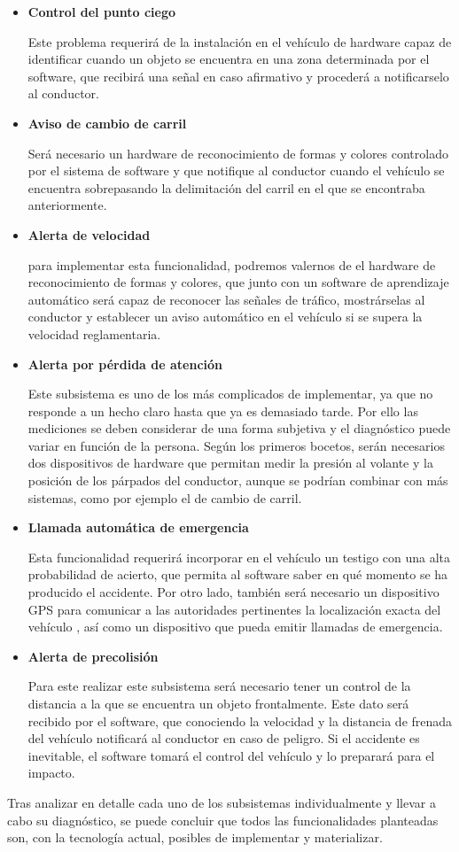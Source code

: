 \begin{itemize}[-]
\item \textbf{Control del punto ciego}
\par Este problema requerirá de la instalación en el vehículo de hardware capaz de identificar cuando un objeto se encuentra en una zona determinada por el software, que recibirá una señal en caso afirmativo y procederá a notificarselo al conductor.

\item \textbf{Aviso de cambio de carril}
\par Será necesario un hardware de reconocimiento de formas y colores controlado por el sistema de software y que notifique al conductor cuando el vehículo se encuentra sobrepasando la delimitación del carril en el que se encontraba anteriormente.

\item \textbf{Alerta de velocidad}
\par para implementar esta funcionalidad, podremos valernos de el hardware de reconocimiento de formas y colores, que junto con un software de aprendizaje automático será capaz de reconocer las señales de tráfico, mostrárselas al conductor y establecer un aviso automático en el vehículo si se supera la velocidad reglamentaria.

\item \textbf{Alerta por pérdida de atención}
\par Este subsistema es uno de los más complicados de implementar, ya que no responde a un hecho claro hasta que ya es demasiado tarde. Por ello las mediciones se deben considerar de una forma subjetiva y el diagnóstico puede variar en función de la persona. Según los primeros bocetos, serán necesarios dos dispositivos de hardware que permitan medir la presión al volante y la posición de los párpados del conductor, aunque se podrían combinar con más sistemas, como por ejemplo el de cambio de carril.

\item \textbf{Llamada automática de emergencia}
\par Esta funcionalidad requerirá incorporar en el vehículo un testigo con una alta probabilidad de acierto, que permita al software saber en qué momento se ha producido el accidente. Por otro lado, también será necesario un dispositivo GPS para comunicar a las autoridades pertinentes la localización exacta del vehículo , así como un dispositivo que pueda emitir llamadas de emergencia.

\item \textbf{Alerta de precolisión}
\par Para este realizar este subsistema será necesario tener un control de la distancia a la que se encuentra un objeto frontalmente. Este dato será recibido por el software, que conociendo la velocidad y la distancia de frenada del vehículo notificará al conductor en caso de peligro. Si el accidente es inevitable, el software tomará el control del vehículo y lo preparará para el impacto.

\end{itemize}

\par Tras analizar en detalle cada uno de los subsistemas individualmente y llevar a cabo su diagnóstico, se puede concluir que todos las funcionalidades planteadas son, con la tecnología actual, posibles de implementar y materializar.
